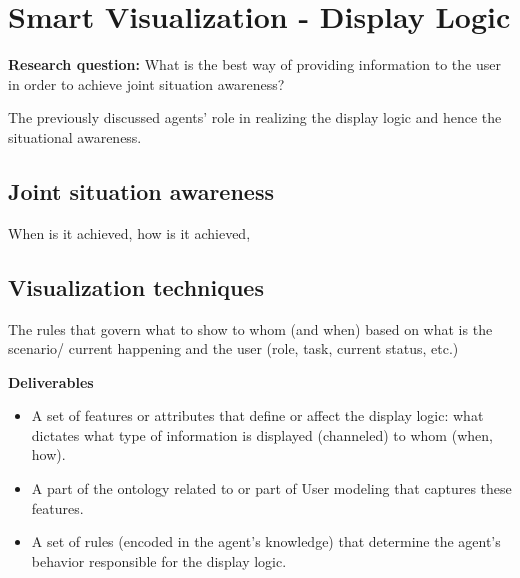 \section{Smart Visualization - Display Logic}

\textbf{Research question:} What is the best way of providing information to the user in order to achieve joint situation awareness? 

The previously discussed agents' role in realizing the display logic and hence the situational awareness.

\subsection{Joint situation awareness}

When is it achieved, how is it achieved,

\subsection{Visualization techniques}

The rules that govern what to show to whom (and when) based on what is the scenario/ current happening and the user (role, task, current status, etc.) 

  
\textbf{Deliverables}
\begin{itemize}
\item A set of features or attributes that define or affect the display logic: what dictates what type of information is displayed (channeled) to whom (when, how). 
\item A part of the ontology related to or part of User modeling that captures these features.
\item A set of rules (encoded in the agent's knowledge) that determine the agent's behavior responsible for the display logic. 
\end{itemize}
